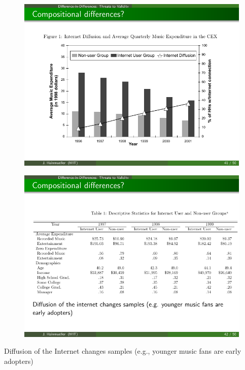 \documentclass{beamer}
\begin{document}
\begin{frame}[plain]
	\begin{figure}
	\includegraphics{./lecture_includes/Hong_1.pdf}
	\end{figure}
	
\end{frame}

\begin{frame}[shrink=20,plain]
	\begin{figure}
	\includegraphics{./lecture_includes/Hong_2.pdf}
	\end{figure}
	
	Diffusion of the Internet changes samples (e.g., younger music fans are early adopters)
	
\end{frame}
\end{document}
